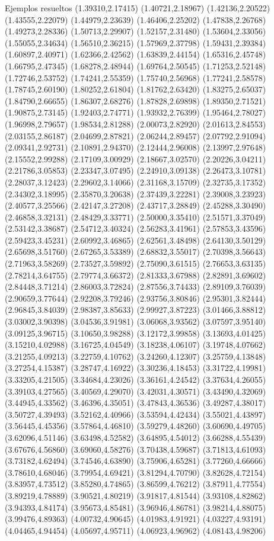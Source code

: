 \documentclass[11pt,a4paper]{article}
\begin{document}
\begin{fmex}{Ejemplos resueltos}
(1.39310,2.17415) (1.40721,2.18967) (1.42136,2.20522) (1.43555,2.22079) (1.44979,2.23639) (1.46406,2.25202) (1.47838,2.26768) (1.49273,2.28336) (1.50713,2.29907) (1.52157,2.31480) (1.53604,2.33056) (1.55055,2.34634) (1.56510,2.36215) (1.57969,2.37798) (1.59431,2.39384) (1.60897,2.40971) (1.62366,2.42562) (1.63839,2.44154) (1.65316,2.45748) (1.66795,2.47345) (1.68278,2.48944) (1.69764,2.50545) (1.71253,2.52148) (1.72746,2.53752) (1.74241,2.55359) (1.75740,2.56968) (1.77241,2.58578) (1.78745,2.60190) (1.80252,2.61804) (1.81762,2.63420) (1.83275,2.65037) (1.84790,2.66655) (1.86307,2.68276) (1.87828,2.69898) (1.89350,2.71521) (1.90875,2.73145) (1.92403,2.74771) (1.93932,2.76399) (1.95464,2.78027) (1.96998,2.79657) (1.98534,2.81288) (2.00073,2.82920) (2.01613,2.84553) (2.03155,2.86187) (2.04699,2.87821) (2.06244,2.89457) (2.07792,2.91094) (2.09341,2.92731) (2.10891,2.94370) (2.12444,2.96008) (2.13997,2.97648) (2.15552,2.99288) (2.17109,3.00929) (2.18667,3.02570) (2.20226,3.04211) (2.21786,3.05853) (2.23347,3.07495) (2.24910,3.09138) (2.26473,3.10781) (2.28037,3.12423) (2.29602,3.14066) (2.31168,3.15709) (2.32735,3.17352) (2.34302,3.18995) (2.35870,3.20638) (2.37439,3.22281) (2.39008,3.23923) (2.40577,3.25566) (2.42147,3.27208) (2.43717,3.28849) (2.45288,3.30490) (2.46858,3.32131) (2.48429,3.33771) (2.50000,3.35410) (2.51571,3.37049) (2.53142,3.38687) (2.54712,3.40324) (2.56283,3.41961) (2.57853,3.43596) (2.59423,3.45231) (2.60992,3.46865) (2.62561,3.48498) (2.64130,3.50129) (2.65698,3.51760) (2.67265,3.53389) (2.68832,3.55017) (2.70398,3.56643) (2.71963,3.58269) (2.73527,3.59892) (2.75090,3.61515) (2.76653,3.63135) (2.78214,3.64755) (2.79774,3.66372) (2.81333,3.67988) (2.82891,3.69602) (2.84448,3.71214) (2.86003,3.72824) (2.87556,3.74433) (2.89109,3.76039) (2.90659,3.77644) (2.92208,3.79246) (2.93756,3.80846) (2.95301,3.82444) (2.96845,3.84039) (2.98387,3.85633) (2.99927,3.87223) (3.01466,3.88812) (3.03002,3.90398) (3.04536,3.91981) (3.06068,3.93562) (3.07597,3.95140) (3.09125,3.96715) (3.10650,3.98288) (3.12172,3.99858) (3.13693,4.01425) (3.15210,4.02988) (3.16725,4.04549) (3.18238,4.06107) (3.19748,4.07662) (3.21255,4.09213) (3.22759,4.10762) (3.24260,4.12307) (3.25759,4.13848) (3.27254,4.15387) (3.28747,4.16922) (3.30236,4.18453) (3.31722,4.19981) (3.33205,4.21505) (3.34684,4.23026) (3.36161,4.24542) (3.37634,4.26055) (3.39103,4.27565) (3.40569,4.29070) (3.42031,4.30571) (3.43490,4.32069) (3.44945,4.33562) (3.46396,4.35051) (3.47843,4.36536) (3.49287,4.38017) (3.50727,4.39493) (3.52162,4.40966) (3.53594,4.42434) (3.55021,4.43897) (3.56445,4.45356) (3.57864,4.46810) (3.59279,4.48260) (3.60690,4.49705) (3.62096,4.51146) (3.63498,4.52582) (3.64895,4.54012) (3.66288,4.55439) (3.67676,4.56860) (3.69060,4.58276) (3.70438,4.59687) (3.71813,4.61093) (3.73182,4.62494) (3.74546,4.63890) (3.75906,4.65281) (3.77260,4.66666) (3.78610,4.68046) (3.79954,4.69421) (3.81294,4.70790) (3.82628,4.72154) (3.83957,4.73512) (3.85280,4.74865) (3.86599,4.76212) (3.87911,4.77554) (3.89219,4.78889) (3.90521,4.80219) (3.91817,4.81544) (3.93108,4.82862) (3.94393,4.84174) (3.95673,4.85481) (3.96946,4.86781) (3.98214,4.88075) (3.99476,4.89363) (4.00732,4.90645) (4.01983,4.91921) (4.03227,4.93191) (4.04465,4.94454) (4.05697,4.95711) (4.06923,4.96962) (4.08143,4.98206) 
\end{fmex}
\end{document}

